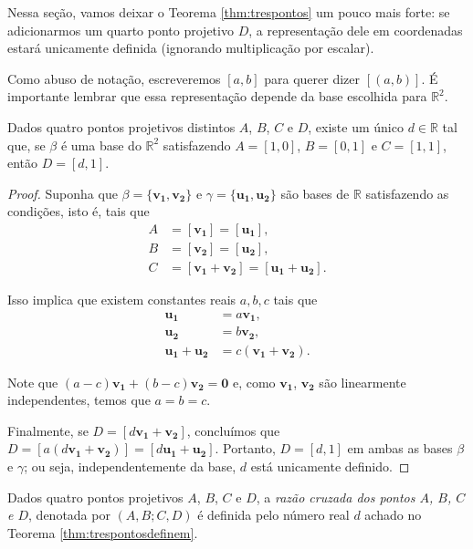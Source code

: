 Nessa seção, vamos deixar o Teorema \ref{thm:trespontos} um pouco mais forte: se adicionarmos um quarto ponto projetivo \(D\), a representação dele em coordenadas estará unicamente definida (ignorando multiplicação por escalar).

Como abuso de notação, escreveremos \([a, b]\) para querer dizer \([(a, b)]\). É importante lembrar que essa representação depende da base escolhida para \(\mathbb{R}^2\).

\begin{thm}\label{thm:trespontosdefinem}
  Dados quatro pontos projetivos distintos \(A\), \(B\), \(C\) e \(D\), existe um único \(d \in \mathbb{R}\) tal que, se \(\beta\) é uma base do \(\mathbb{R}^2\) satisfazendo \(A = [1, 0]\), \(B = [0, 1]\) e \(C = [1, 1]\), então \(D = [d, 1]\).
\end{thm}
\begin{proof}
  Suponha que \(\beta = \{\mathbf{v_1}, \mathbf{v_2}\}\) e \(\gamma = \{\mathbf{u_1}, \mathbf{u_2}\}\) são bases de \(\mathbb{R}\) satisfazendo as condições, isto é, tais que
  \begin{align}
    A &= [\mathbf{v_1}] = [\mathbf{u_1}], \\
    B &= [\mathbf{v_2}] = [\mathbf{u_2}], \\
    C &= [\mathbf{v_1} + \mathbf{v_2}] = [\mathbf{u_1} + \mathbf{u_2}].
  \end{align}

  Isso implica que existem constantes reais \(a, b, c\) tais que
  \begin{align}
    \mathbf{u_1} &= a \mathbf{v_1}, \\
    \mathbf{u_2} &= b \mathbf{v_2}, \\
    \mathbf{u_1} + \mathbf{u_2} &= c \left(\mathbf{v_1} + \mathbf{v_2}\right).
  \end{align}

  Note que \((a - c)\mathbf{v_1} + (b - c)\mathbf{v_2} = \mathbf{0}\) e, como \(\mathbf{v_1}\), \(\mathbf{v_2}\) são linearmente independentes, temos que \(a = b = c\).

  Finalmente, se \(D = [d\mathbf{v_1} + \mathbf{v_2}]\), concluímos que \(D = [a\left(d\mathbf{v_1} + \mathbf{v_2}\right)] = [d\mathbf{u_1} + \mathbf{u_2}]\). Portanto, \(D = [d, 1]\) em ambas as bases \(\beta\) e \(\gamma\); ou seja, independentemente da base, \(d\) está unicamente definido.
\end{proof}

\begin{defn}\label{defn:razaocruzada}
  Dados quatro pontos projetivos \(A\), \(B\), \(C\) e \(D\), a \emph{razão cruzada dos pontos \(A\), \(B\), \(C\) e \(D\)}, denotada por \((A, B; C, D)\) é definida pelo número real \(d\) achado no Teorema \ref{thm:trespontosdefinem}.
\end{defn}

